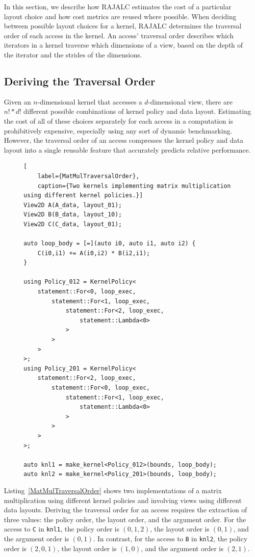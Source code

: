 \documentclass[sigconf, table]{acmart}
\begin{document}
In this section, we describe how RAJALC estimates the cost of a particular layout choice and how cost metrics are reused where possible.
When deciding between possible layout choices for a kernel, RAJALC determines the traversal order of each access in the kernel.
An access' traversal order describes which iterators in a kernel traverse which dimensions of a view, based on the depth of the iterator and the strides of the dimensions.

\subsection{Deriving the Traversal Order}

Given an $n$-dimensional kernel that accesses a $d$-dimensional view, there are $n! * d!$ different possible combinations of kernel policy and data layout. 
Estimating the cost of all of these choices separately for each access in a computation is prohibitively expensive, especially using any sort of dynamic benchmarking. 
However, the traversal order of an access compresses the kernel policy and data layout into a single reusable feature that accurately predicts relative performance.


\begin{figure}
\begin{lstlisting}[
	label={MatMulTraversalOrder}, 
	caption={Two kernels implementing matrix multiplication using different kernel policies.}]
View2D A(A_data, layout_01);
View2D B(B_data, layout_10);
View2D C(C_data, layout_01);

auto loop_body = [=](auto i0, auto i1, auto i2) {
	C(i0,i1) += A(i0,i2) * B(i2,i1);
}

using Policy_012 = KernelPolicy<
	statement::For<0, loop_exec,
    	statement::For<1, loop_exec,
	  		statement::For<2, loop_exec,
			  	statement::Lambda<0>
	  		>
		>
  	>
>;
using Policy_201 = KernelPolicy<
	statement::For<2, loop_exec,
    	statement::For<0, loop_exec,
	  		statement::For<1, loop_exec,
			  	statement::Lambda<0>
	  		>
		>
  	>
>;

auto knl1 = make_kernel<Policy_012>(bounds, loop_body);
auto knl2 = make_kernel<Policy_201>(bounds, loop_body);
\end{lstlisting}
\end{figure}

Listing~\ref{MatMulTraversalOrder} shows two implementations of a matrix multiplication using different kernel policies and involving views using different data layouts.
Deriving the traversal order for an access requires the extraction of three values: the policy order, the layout order, and the argument order. 
For the access to \verb.C. in \verb.knl1., the policy order is $(0,1,2)$, the layout order is $(0,1)$, and the argument order is $(0,1)$. 
In contrast, for the access to \verb.B. in \verb.knl2., the policy order is $(2,0,1)$, the layout order is $(1,0)$, and the argument order is $(2,1)$. 
\end{document}
